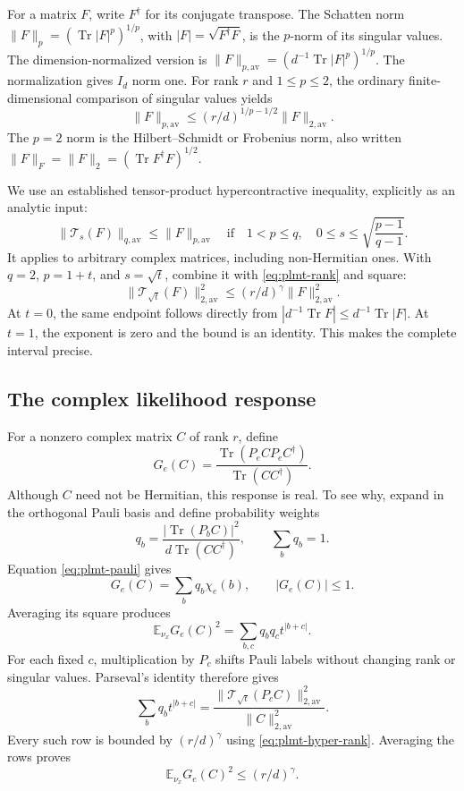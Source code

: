 \documentclass[11pt,a4paper]{article}
\numberwithin{equation}{section}
\theoremstyle{definition}
\theoremstyle{remark}
\begin{document}
For a matrix \(F\), write \(F^\dagger\) for its conjugate transpose. The Schatten norm
\(\|F\|_p=(\operatorname{Tr}|F|^p)^{1/p}\), with
\(|F|=\sqrt{F^\dagger F}\), is the \(p\)-norm of its singular values. The dimension-normalized version is
\(\|F\|_{p,\mathrm{av}}=(d^{-1}\operatorname{Tr}|F|^p)^{1/p}\).
The normalization gives \(I_d\) norm one. For rank \(r\) and \(1\leq p\leq2\), the ordinary finite-dimensional comparison of singular values yields
\begin{equation}
 \|F\|_{p,\mathrm{av}}
 \leq(r/d)^{1/p-1/2}\|F\|_{2,\mathrm{av}}.
 \label{eq:plmt-rank}
\end{equation}
The \(p=2\) norm is the Hilbert--Schmidt or Frobenius norm, also written
\(\|F\|_F=\|F\|_2=(\operatorname{Tr}F^\dagger F)^{1/2}\).

We use an established tensor-product hypercontractive inequality, explicitly as an analytic input:
\[
 \|\mathcal T_s(F)\|_{q,\mathrm{av}}\leq\|F\|_{p,\mathrm{av}}
 \quad\text{if}\quad
 1<p\leq q,\quad
 0\leq s\leq\sqrt{\frac{p-1}{q-1}}.
\]
It applies to arbitrary complex matrices, including non-Hermitian ones. With \(q=2\), \(p=1+t\), and \(s=\sqrt t\), combine it with \eqref{eq:plmt-rank} and square:
\begin{equation}
 \|\mathcal T_{\sqrt t}(F)\|_{2,\mathrm{av}}^2
 \leq(r/d)^\gamma\|F\|_{2,\mathrm{av}}^2.
 \label{eq:plmt-hyper-rank}
\end{equation}
At \(t=0\), the same endpoint follows directly from
\(|d^{-1}\operatorname{Tr}F|\leq d^{-1}\operatorname{Tr}|F|\).
At \(t=1\), the exponent is zero and the bound is an identity. This makes the complete interval precise.

\subsection{The complex likelihood response}
For a nonzero complex matrix \(C\) of rank \(r\), define
\begin{equation}
 G_e(C)=
 \frac{\operatorname{Tr}(P_eCP_eC^\dagger)}
 {\operatorname{Tr}(CC^\dagger)}.
\end{equation}
Although \(C\) need not be Hermitian, this response is real. To see why, expand in the orthogonal Pauli basis and define probability weights
\[
 q_b=\frac{|\operatorname{Tr}(P_bC)|^2}
 {d\operatorname{Tr}(CC^\dagger)},\qquad \sum_bq_b=1.
\]
Equation \eqref{eq:plmt-pauli} gives
\[
 G_e(C)=\sum_bq_b\chi_e(b),\qquad |G_e(C)|\leq1.
\]
Averaging its square produces
\[
 \mathbb E_{\nu_x}G_e(C)^2
 =\sum_{b,c}q_bq_ct^{|b+c|}.
\]
For each fixed \(c\), multiplication by \(P_c\) shifts Pauli labels without changing rank or singular values. Parseval's identity therefore gives
\[
 \sum_bq_bt^{|b+c|}
 =
 \frac{\|\mathcal T_{\sqrt t}(P_cC)\|_{2,\mathrm{av}}^2}
 {\|C\|_{2,\mathrm{av}}^2}.
\]
Every such row is bounded by \((r/d)^\gamma\) using \eqref{eq:plmt-hyper-rank}. Averaging the rows proves
\begin{equation}
 \boxed{\mathbb E_{\nu_x}G_e(C)^2\leq(r/d)^\gamma.}
 \label{eq:plmt-G}
\end{equation}
\end{document}
